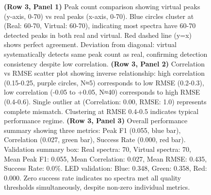 \begin{figure}[htbp]
{    \textbf{(Row 3, Panel 1)} Peak count comparison showing virtual peaks (y-axis, 0-70) vs real peaks (x-axis, 0-70). Blue circles cluster at (Real: 60-70, Virtual: 60-70), indicating most spectra have 60-70 detected peaks in both real and virtual. Red dashed line (y=x) shows perfect agreement. Deviation from diagonal: virtual systematically detects same peak count as real, confirming detection consistency despite low correlation. 
    \textbf{(Row 3, Panel 2)} Correlation vs RMSE scatter plot showing inverse relationship: high correlation (0.15-0.25, purple circles, N≈5) corresponds to low RMSE (0.2-0.3), low correlation (-0.05 to +0.05, N≈40) corresponds to high RMSE (0.4-0.6). Single outlier at (Correlation: 0.00, RMSE: 1.0) represents complete mismatch. Clustering at RMSE 0.4-0.5 indicates typical performance regime. 
    \textbf{(Row 3, Panel 3)} Overall performance summary showing three metrics: Peak F1 (0.055, blue bar), Correlation (0.027, green bar), Success Rate (0.000, red bar). Validation summary box: Real spectra: 70, Virtual spectra: 70, Mean Peak F1: 0.055, Mean Correlation: 0.027, Mean RMSE: 0.435, Success Rate: 0.0\%. LED validation: Blue: 0.348, Green: 0.358, Red: 0.000. Zero success rate indicates no spectra met all quality thresholds simultaneously, despite non-zero individual metrics.}
    \label{fig:validation_comprehensive}
\end{figure}

